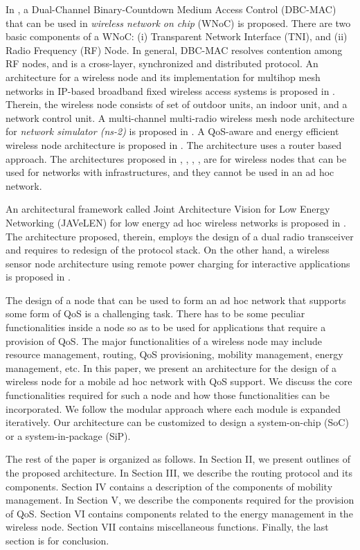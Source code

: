 \documentclass[10pt,times,epsfig,psfig,twocolumn,algorithm,algorithmic]{IEEEtran}
\begin{document}
In \cite{zhao}, a Dual-Channel Binary-Countdown Medium Access Control (DBC-MAC) that can be used in {\em wireless network on chip} (WNoC) is proposed. There are two basic components of a WNoC: (i) Transparent Network Interface (TNI), and (ii) Radio Frequency (RF) Node. In general, DBC-MAC resolves contention among RF nodes, and is a cross-layer, synchronized and distributed protocol. An architecture for a wireless node and its implementation for multihop mesh networks in IP-based broadband fixed wireless access systems is proposed in \cite{kishi}. Therein, the wireless node consists of set of outdoor units, an indoor unit, and a network control unit. A multi-channel multi-radio wireless mesh node architecture for {\em network simulator (ns-2)} is proposed in \cite{ji}. A QoS-aware and energy efficient wireless node architecture is proposed in \cite{lettieri}. The architecture uses a router based approach. The architectures proposed in \cite{zhao}, \cite{kishi}, \cite{lettieri}, \cite{ji},   are for wireless nodes that can be used for networks with infrastructures, and they cannot be used in an ad hoc network.   

An architectural framework called Joint Architecture Vision for Low Energy Networking (JAVeLEN) for low energy ad hoc wireless networks is proposed in \cite{redi}. The architecture proposed, therein, employs the design of a dual radio transceiver and requires to redesign of the protocol stack. On the other hand, a wireless sensor node architecture using remote power charging for interactive applications is proposed in \cite{dsouza}. 


The design of a node that can be used to form an ad hoc network that supports some form of QoS is a challenging task. There has to be some peculiar functionalities inside a node so as to be used for applications that require a provision of QoS. The major functionalities of a wireless node may include resource management, routing, QoS provisioning, mobility management, energy management, etc. In this paper, we present an architecture for the design of a wireless node for a mobile ad hoc network with QoS support. We discuss the core functionalities required for such a node and how those functionalities can be incorporated. We follow the modular approach where each module is expanded iteratively. Our architecture can be customized to design a system-on-chip (SoC) or a system-in-package (SiP).   

The rest of the paper is organized as follows. In Section II, we present outlines of the proposed architecture. In Section III, we describe the routing protocol and its components. Section IV contains a description of the components of mobility management. In Section V, we describe the components required for the provision of QoS. Section VI contains components related to the energy management in the wireless node. Section VII contains miscellaneous functions. Finally, the last section is for conclusion.
\end{document}
